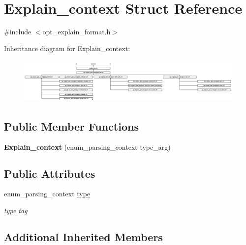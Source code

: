 \hypertarget{structExplain__context}{}\section{Explain\+\_\+context Struct Reference}
\label{structExplain__context}


{\ttfamily \#include $<$opt\+\_\+explain\+\_\+format.\+h$>$}

Inheritance diagram for Explain\+\_\+context\+:\begin{figure}[H]
\begin{center}
\leavevmode
\includegraphics[height=2.288828cm]{structExplain__context}
\end{center}
\end{figure}
\subsection*{Public Member Functions}
\begin{DoxyCompactItemize}
\item 
\mbox{\label{structExplain__context_adbfd05373d0c82b530217203eb4d40f4}} 
{\bfseries Explain\+\_\+context} (enum\+\_\+parsing\+\_\+context type\+\_\+arg)
\end{DoxyCompactItemize}
\subsection*{Public Attributes}
\begin{DoxyCompactItemize}
\item 
\mbox{\label{structExplain__context_a278880d628948c62d2674cd680af3e14}} 
enum\+\_\+parsing\+\_\+context \mbox{\hyperlink{structExplain__context_a278880d628948c62d2674cd680af3e14}{type}}
\begin{DoxyCompactList}\small\item\em type tag \end{DoxyCompactList}\end{DoxyCompactItemize}
\subsection*{Additional Inherited Members}


